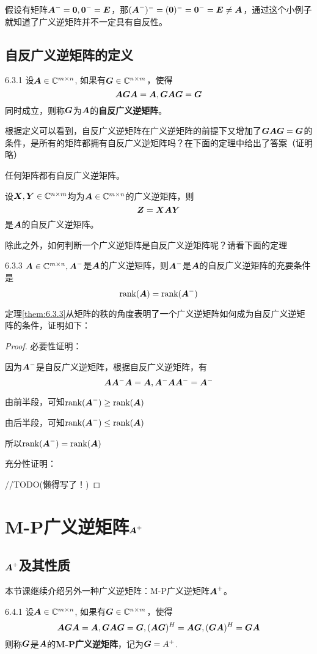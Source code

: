 \documentclass[12pt, a4paper, oneside, UTF8]{ctexbook}
\begin{document}
假设有矩阵$\A^-=\bs{0},\bs{0}^-=\bs{E}$，那$(\A^-)^-=(\bs{0})^-=\bs{0}^-=\bs{E}\neq \A$，通过这个小例子就知道了广义逆矩阵并不一定具有自反性。

\subsection{自反广义逆矩阵的定义}
\begin{defn}{}{6.3.1}
    设$\A\in\C^{m\times n}$, 如果有$\G\in\C^{n\times m}$，使得\[\A\G\A=\A, \G\A\G=\G\]同时成立，则称$\G$为$\A$的\textbf{自反广义逆矩阵}。
\end{defn}

根据定义可以看到，自反广义逆矩阵在广义逆矩阵的前提下又增加了$\G\A\G=\G$的条件，是所有的矩阵都拥有自反广义逆矩阵吗？在下面的定理中给出了答案（证明略）
\begin{them}{}{}
    任何矩阵都有自反广义逆矩阵。
\end{them}

\begin{them}{}{}
    设$\X,\Y\in\C^{n\times m}$均为$\A\in\C^{m\times n}$的广义逆矩阵，则\[\Z=\X\A\Y\]是$\A$的自反广义逆矩阵。
\end{them}

除此之外，如何判断一个广义逆矩阵是自反广义逆矩阵呢？请看下面的定理
\begin{them}{}{6.3.3}
    $\A\in\C^{m\times n}, \A^-$是$\A$的广义逆矩阵，则$\A^-$是$\A$的自反广义逆矩阵的充要条件是\[\rank(\A)=\rank(\A^-)\]
\end{them}
定理\ref{them:6.3.3}从矩阵的秩的角度表明了一个广义逆矩阵如何成为自反广义逆矩阵的条件，证明如下：

\begin{proof}

    必要性证明：

    因为$\A^-$是自反广义逆矩阵，根据自反广义逆矩阵，有\[\A\A^-\A=\A, \A^-\A\A^-=\A^-\]

    由前半段，可知$\rank(\A^-)\geq\rank(\A)$

    由后半段，可知$\rank(\A^-)\leq\rank(\A)$

    所以$\rank(\A^-)=\rank(\A)$

    充分性证明：

    //TODO(懒得写了！)
\end{proof}

\section{M-P广义逆矩阵$\A^+$}
\subsection{$\A^+$及其性质}
本节课继续介绍另外一种广义逆矩阵：M-P广义逆矩阵$\A^+$。
\begin{defn}{}{6.4.1}
    设$\A\in\C^{m\times n}$, 如果有$\G\in\C^{n\times m}$，使得\[\A\G\A=\A, \G\A\G=\G, (\A\G)^H=\A\G, (\G\A)^H=\G\A\]则称$\G$是$\A$的\textbf{M-P广义逆矩阵}，记为$\G=A^+$.
\end{defn}
\end{document}
